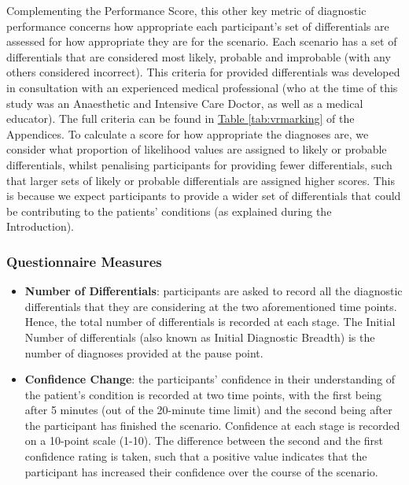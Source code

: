 \documentclass[a4paper, nobind]{templates/ociamthesis}
\begin{document}
Complementing the Performance Score, this other key metric of diagnostic performance concerns how appropriate each participant's set of differentials are assessed for how appropriate they are for the scenario. Each scenario has a set of differentials that are considered most likely, probable and improbable (with any others considered incorrect). This criteria for provided differentials was developed in consultation with an experienced medical professional (who at the time of this study was an Anaesthetic and Intensive Care Doctor, as well as a medical educator). The full criteria can be found in \hyperref[tab:vrmarking]{Table \ref{tab:vrmarking}} of the Appendices. To calculate a score for how appropriate the diagnoses are, we consider what proportion of likelihood values are assigned to likely or probable differentials, whilst penalising participants for providing fewer differentials, such that larger sets of likely or probable differentials are assigned higher scores. This is because we expect participants to provide a wider set of differentials that could be contributing to the patients' conditions (as explained during the Introduction).

\newpage

\subsubsection{Questionnaire Measures}\label{questionnaire-measures}

\begin{itemize}
\item
  \textbf{Number of Differentials}: participants are asked to record all the diagnostic differentials that they are considering at the two aforementioned time points. Hence, the total number of differentials is recorded at each stage. The Initial Number of differentials (also known as Initial Diagnostic Breadth) is the number of diagnoses provided at the pause point.
\item
  \textbf{Confidence Change}: the participants' confidence in their understanding of the patient's condition is recorded at two time points, with the first being after 5 minutes (out of the 20-minute time limit) and the second being after the participant has finished the scenario. Confidence at each stage is recorded on a 10-point scale (1-10). The difference between the second and the first confidence rating is taken, such that a positive value indicates that the participant has increased their confidence over the course of the scenario.
\end{itemize}
\end{document}
